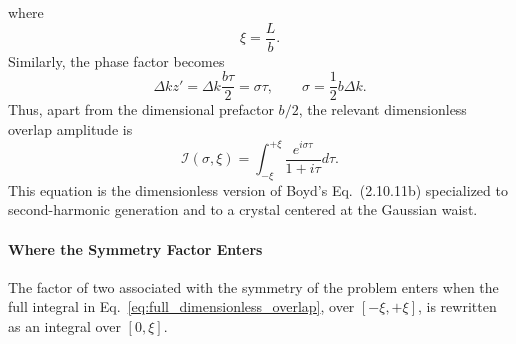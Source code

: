 \begin{resolucao}[Solution]
\begin{equation}
        \end{equation}
        where
        \begin{equation}
            \xi=\frac{L}{b}.
            \label{eq:xi_definition}
        \end{equation}
        Similarly, the phase factor becomes
        \begin{equation}
            \Delta k z'
            =
            \Delta k \frac{b\tau}{2}
            =
            \sigma \tau,
            \qquad
            \sigma=\frac{1}{2}b\Delta k.
            \label{eq:sigma_definition}
        \end{equation}
        Thus, apart from the dimensional prefactor $b/2$, the relevant dimensionless overlap amplitude is
        \begin{equation}
            \mathcal I(\sigma,\xi)
            =
            \int_{-\xi}^{+\xi}
            \frac{
            e^{i\sigma\tau}
            }{
            1+i\tau
            }
            d\tau.
            \label{eq:full_dimensionless_overlap}
        \end{equation}
        This equation is the dimensionless version of Boyd's Eq.~(2.10.11b) specialized to second-harmonic generation and to a crystal centered at the Gaussian waist.

    \paragraph*{Where the Symmetry Factor Enters}
        The factor of two associated with the symmetry of the problem enters when the full integral in Eq.~\eqref{eq:full_dimensionless_overlap}, over $[-\xi,+\xi]$, is rewritten as an integral over $[0,\xi]$.


\end{resolucao}
